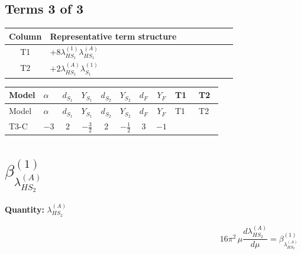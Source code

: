 \documentclass[8pt]{article}
\begin{document}
\begin{landscape}
\subsection*{Terms 3 of 3}
\begin{center}
\begin{tabular}{@{}c >{\raggedright\arraybackslash}p{0.82\linewidth}@{}}
\toprule
Column & Representative term structure \\
\midrule
T1 & \(\displaystyle +8 {\lambda_{HS_1}^{(1)}} {\lambda_{HS_1}^{(A)}}\) \\
\midrule
T2 & \(\displaystyle +2 {\lambda_{HS_1}^{(A)}} {\lambda_{S_1}^{(1)}}\) \\
\midrule
\bottomrule
\end{tabular}
\end{center}
\smallskip
\tiny
\begin{longtable}{@{}llcccccc >{\raggedright\arraybackslash}p{0.21\linewidth} >{\raggedright\arraybackslash}p{0.21\linewidth}@{}}
\toprule
Model & $\alpha$ & $d_{S_1}$ & $Y_{S_1}$ & $d_{S_2}$ & $Y_{S_2}$ & $d_F$ & $Y_F$ & T1 & T2 \\
\midrule
\endfirsthead
\toprule
Model & $\alpha$ & $d_{S_1}$ & $Y_{S_1}$ & $d_{S_2}$ & $Y_{S_2}$ & $d_F$ & $Y_F$ & T1 & T2 \\
\midrule
\endhead
T3-C & $-3$ & $2$ & $-\frac{3}{2}$ & $2$ & $-\frac{1}{2}$ & $3$ & $-1$ & \scriptsize\adjustbox{max width=\linewidth}{$\begin{gathered} +8 {\lambda_{HS_1}^{(1)}} {\lambda_{HS_1}^{(A)}}\end{gathered}$} & \scriptsize\adjustbox{max width=\linewidth}{$\begin{gathered} +2 {\lambda_{HS_1}^{(A)}} {\lambda_{S_1}^{(1)}}\end{gathered}$} \\
\midrule
\bottomrule
\end{longtable}
\clearpage
\section*{$\beta_{\lambda_{HS_2}^{(A)}}^{(1)}$}
\noindent\textbf{Quantity: }$\lambda_{HS_2}^{(A)}$\par\smallskip
\[16\pi^2\,\mu\frac{d \lambda_{HS_2}^{(A)}}{d\mu}=\beta_{\lambda_{HS_2}^{(A)}}^{(1)}\]

\end{landscape}
\end{document}
